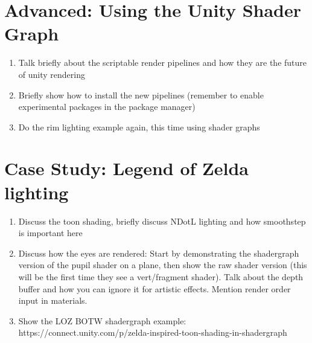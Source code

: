 \documentclass[11pt]{article}
\begin{document}
\section{Advanced: Using the Unity Shader Graph}

\begin{enumerate}
	\item Talk briefly about the scriptable render pipelines and how they are the future of unity rendering
	\item Briefly show how to install the new pipelines (remember to enable experimental packages in the package manager)
	\item Do the rim lighting example again, this time using shader graphs
\end{enumerate}

\section{Case Study: Legend of Zelda lighting}

\begin{enumerate}
	\item Discuss the toon shading, briefly discuss NDotL lighting and how smoothstep is important here
	\item Discuss how the eyes are rendered: Start by demonstrating the shadergraph version of the pupil shader on a plane, then show the raw shader version (this will be the first time they see a vert/fragment shader).  Talk about the depth buffer and how you can ignore it for artistic effects.  Mention render order input in materials.
	\item Show the LOZ BOTW shadergraph example: https://connect.unity.com/p/zelda-inspired-toon-shading-in-shadergraph
\end{enumerate}
\end{document}
